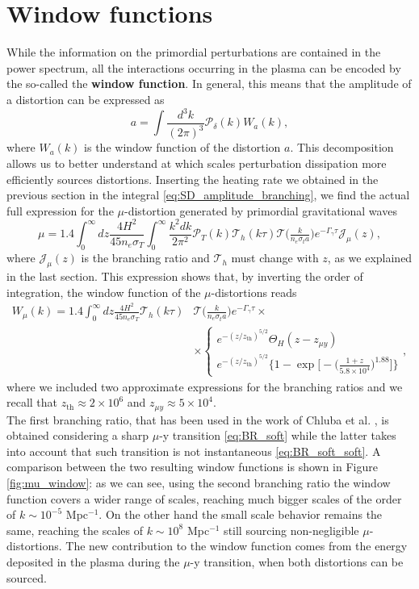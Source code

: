 \section{Window functions}
While the information on the primordial perturbations are contained in the power spectrum, all the interactions occurring in the plasma can be encoded by the so-called the \textbf{window function}. In general, this means that the amplitude of a distortion can be expressed as
\begin{equation}\label{eq:window_function}
    a=\int\frac{d^3k}{(2\pi)^3}\mathcal P_\delta(k) W_a(k),
\end{equation}
where $W_a(k)$ is the window function of the distortion $a$. This decomposition allows us to better understand at which scales perturbation dissipation more efficiently sources distortions. Inserting the heating rate we obtained in the previous section in the integral \eqref{eq:SD_amplitude_branching}, we find the actual full expression for the $\mu$-distortion generated by primordial gravitational waves
$$\mu=1.4\int_{0}^\infty dz\frac{4H^2}{45 n_e\sigma_T}\int_0^\infty\frac{k^2dk}{2\pi^2}\mathcal P_T(k)\mathcal T_h(k\tau)\mathcal T\Big(\tfrac{k}{n_e\sigma_ta}\Big)e^{-\Gamma_\gamma\tau}\mathcal{J}_\mu(z),$$
where $\mathcal{J}_\mu(z)$ is the branching ratio and $\mathcal T_h$ must change with $z$, as we explained in the last section.
This expression shows that, by inverting the order of integration, the window function of the $\mu$-distortions reads
\begin{align*}
    W_\mu(k)=1.4\int_{0}^\infty dz\frac{4H^2}{45 n_e\sigma_T}\mathcal T_h(k\tau)&\mathcal T\Big(\tfrac{k}{n_e\sigma_ta}\Big)e^{-\Gamma_\gamma\tau}\times\\&\times
    \begin{cases}
        e^{-(z/z_{\text{th}})^{5/2}}\Theta_H(z-z_{\mu y})\\
        e^{-(z/z_{\text{th}})^{5/2}}\Bigg\{1-\exp\bigg[-\big(\frac{1+z}{5.8\times10^4}\big)^{1.88}\bigg]\Bigg\}
    \end{cases},
\end{align*}
where we included two approximate expressions for the branching ratios and we recall that $z_\text{th}\approx 2\times 10^6$ and $z_{\mu y}\approx 5\times 10^4$.\\
The first branching ratio, that has been used in the work of Chluba et al. \cite{Chluba_tens_diss}, is obtained considering a sharp $\mu$-y transition \eqref{eq:BR_soft} while the latter takes into account that such transition is not instantaneous \eqref{eq:BR_soft_soft}. A comparison between the two resulting window functions is shown in Figure \ref{fig:mu_window}: as we can see, using the second branching ratio the window function covers a wider range of scales, reaching much bigger scales of the order of $k\sim10^{-5}$ Mpc$^{-1}$. On the other hand the small scale behavior remains the same, reaching the scales of $k\sim10^{8}$ Mpc$^{-1}$ still sourcing non-negligible $\mu$-distortions. The new contribution to the window function comes from the energy deposited in the plasma during the $\mu$-y transition, when both distortions can be sourced.
